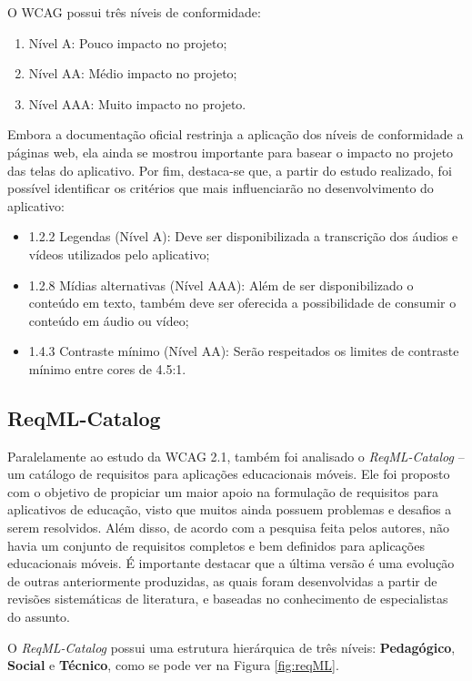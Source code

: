 O WCAG possui três níveis de conformidade:
\begin{enumerate}
    \item Nível A: Pouco impacto no projeto;
    \item Nível AA: Médio impacto no projeto;
    \item Nível AAA: Muito impacto no projeto.
\end{enumerate}

Embora a documentação oficial restrinja a aplicação dos níveis de conformidade a páginas web, ela ainda se mostrou importante para basear o impacto no projeto das telas do aplicativo. 
 Por fim, destaca-se que, a partir do estudo realizado, foi possível identificar os critérios que mais influenciarão no desenvolvimento do aplicativo:

\begin{itemize}
    \item 1.2.2 Legendas (Nível A): Deve ser disponibilizada a transcrição dos áudios e vídeos utilizados pelo aplicativo;
    \item 1.2.8 Mídias alternativas (Nível AAA): Além de ser disponibilizado o conteúdo em texto, também deve ser oferecida a possibilidade de consumir o conteúdo em áudio ou vídeo;
    \item 1.4.3 Contraste mínimo (Nível AA): Serão respeitados os limites de contraste mínimo entre cores de 4.5:1.
\end{itemize}


\subsection{ReqML-Catalog}
Paralelamente ao estudo da WCAG 2.1, também foi analisado o \textit{ReqML-Catalog}
\citep{soad2017reqml} -- um catálogo de requisitos para aplicações educacionais móveis. Ele foi proposto com o objetivo de propiciar um maior apoio na formulação de requisitos para aplicativos de educação, visto que muitos ainda possuem problemas e desafios a serem resolvidos. Além disso, de acordo com a pesquisa feita pelos autores, não havia um conjunto de requisitos completos e bem definidos para aplicações educacionais móveis. É importante destacar que a última versão é uma evolução de outras anteriormente produzidas, as quais foram desenvolvidas a partir de revisões sistemáticas de literatura, e baseadas no conhecimento de especialistas do assunto. 

O \textit{ReqML-Catalog} possui uma estrutura hierárquica de três níveis: \textbf{Pedagógico}, \textbf{Social} e \textbf{Técnico}, como se pode ver na Figura \ref{fig:reqML}.


